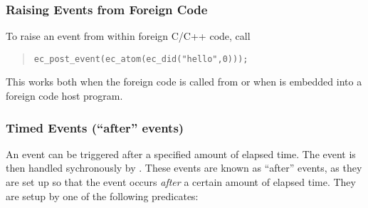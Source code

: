 \subsubsection{Raising Events from Foreign Code}
To raise an event from within foreign C/C++ code, call
\begin{quote}
\begin{verbatim}
ec_post_event(ec_atom(ec_did("hello",0)));
\end{verbatim}
\end{quote}
This works both when the foreign code is called from {\eclipse} or when
{\eclipse} is embedded into a foreign code host program.


\subsubsection{Timed Events (``after'' events)}

An event can be triggered after a specified amount
of elapsed time. The event is then handled sychronously by {\eclipse}.
These events are known as ``after''
events, as they are set up so that the event occurs \emph{after} a
certain amount of elapsed time.
They are setup by one of the following predicates:

